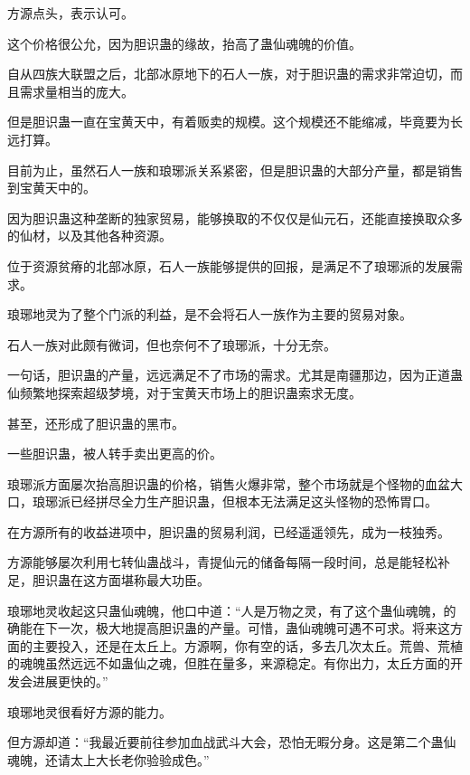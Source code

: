 
\begin{this_body}



方源点头，表示认可。

这个价格很公允，因为胆识蛊的缘故，抬高了蛊仙魂魄的价值。

自从四族大联盟之后，北部冰原地下的石人一族，对于胆识蛊的需求非常迫切，而且需求量相当的庞大。

但是胆识蛊一直在宝黄天中，有着贩卖的规模。这个规模还不能缩减，毕竟要为长远打算。

目前为止，虽然石人一族和琅琊派关系紧密，但是胆识蛊的大部分产量，都是销售到宝黄天中的。

因为胆识蛊这种垄断的独家贸易，能够换取的不仅仅是仙元石，还能直接换取众多的仙材，以及其他各种资源。

位于资源贫瘠的北部冰原，石人一族能够提供的回报，是满足不了琅琊派的发展需求。

琅琊地灵为了整个门派的利益，是不会将石人一族作为主要的贸易对象。

石人一族对此颇有微词，但也奈何不了琅琊派，十分无奈。

一句话，胆识蛊的产量，远远满足不了市场的需求。尤其是南疆那边，因为正道蛊仙频繁地探索超级梦境，对于宝黄天市场上的胆识蛊索求无度。

甚至，还形成了胆识蛊的黑市。

一些胆识蛊，被人转手卖出更高的价。

琅琊派方面屡次抬高胆识蛊的价格，销售火爆非常，整个市场就是个怪物的血盆大口，琅琊派已经拼尽全力生产胆识蛊，但根本无法满足这头怪物的恐怖胃口。

在方源所有的收益进项中，胆识蛊的贸易利润，已经遥遥领先，成为一枝独秀。

方源能够屡次利用七转仙蛊战斗，青提仙元的储备每隔一段时间，总是能轻松补足，胆识蛊在这方面堪称最大功臣。

琅琊地灵收起这只蛊仙魂魄，他口中道：“人是万物之灵，有了这个蛊仙魂魄，的确能在下一次，极大地提高胆识蛊的产量。可惜，蛊仙魂魄可遇不可求。将来这方面的主要投入，还是在太丘上。方源啊，你有空的话，多去几次太丘。荒兽、荒植的魂魄虽然远远不如蛊仙之魂，但胜在量多，来源稳定。有你出力，太丘方面的开发会进展更快的。”

琅琊地灵很看好方源的能力。

但方源却道：“我最近要前往参加血战武斗大会，恐怕无暇分身。这是第二个蛊仙魂魄，还请太上大长老你验验成色。”


\end{this_body}
